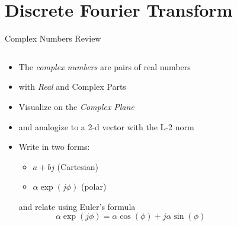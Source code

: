 \section{Discrete Fourier Transform}

\begin{frame}{Complex Numbers Review}
  \begin{columns}
    \begin{column}{0.65\textwidth}
      \begin{itemize}
        \item The \emph{complex numbers} are pairs of real numbers
        \item with \emph{Real} and {Complex Parts}
        \item Visualize on the \emph{Complex Plane}
        \item and analogize to a 2-d vector with the L-2 norm
        \item Write in two forms:
        \begin{itemize}
          \item $a + bj$ (Cartesian)
          \item $\alpha \exp(j \phi)$ (polar)
        \end{itemize}
        and relate using Euler's formula
        \begin{equation}
          \alpha \exp(j \phi) = \alpha \cos(\phi) + j \alpha \sin(\phi)
        \end{equation}
      \end{itemize}
    \end{column}
    \begin{column}{0.35\textwidth}
    \end{column}
  \end{columns}
\end{frame}


